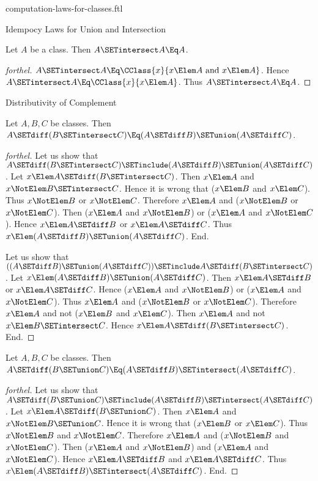 \documentclass{stex}
\begin{document}
\begin{smodule}{computation-laws-for-classes.ftl}
\begin{sfragment}{Idempocy Laws for Union and Intersection}
  \begin{proposition}[forthel]
    Let $A$ be a class.
    Then $A \SETintersect A \Eq A$.
  \end{proposition}
  \begin{proof}[forthel]
    $A \SETintersect A \Eq \CClass{x}{x \Elem A\text{ and }x \Elem A}$.
    Hence $A \SETintersect A \Eq \CClass{x}{x \Elem A}$.
    Thus $A \SETintersect A \Eq A$.
  \end{proof}
\end{sfragment}

\begin{sfragment}{Distributivity of Complement}
  \begin{proposition}[forthel]
    Let $A, B, C$ be classes.
    Then $A \SETdiff (B \SETintersect C) \Eq (A \SETdiff B) \SETunion (A \SETdiff C)$.
  \end{proposition}
  \begin{proof}[forthel]
    Let us show that $A \SETdiff (B \SETintersect C) \SETinclude (A \SETdiff B) \SETunion (A \SETdiff C)$.
      Let $x \Elem A \SETdiff (B \SETintersect C)$.
      Then $x \Elem A$ and $x \NotElem B \SETintersect C$.
      Hence it is wrong that ($x \Elem B$ and $x \Elem C$).
      Thus $x \NotElem B$ or $x \NotElem C$.
      Therefore $x \Elem A$ and ($x \NotElem B$ or $x \NotElem C$).
      Then ($x \Elem A$ and $x \NotElem B$) or ($x \Elem A$ and $x \NotElem C$).
      Hence $x \Elem A \SETdiff B$ or $x \Elem A \SETdiff C$.
      Thus $x \Elem (A \SETdiff B) \SETunion (A \SETdiff C)$.
    End.

    Let us show that $((A \SETdiff B) \SETunion (A \SETdiff C)) \SETinclude A \SETdiff (B \SETintersect C)$. %
      Let $x \Elem (A \SETdiff B) \SETunion (A \SETdiff C)$.
      Then $x \Elem A \SETdiff B$ or $x \Elem A \SETdiff C$.
      Hence ($x \Elem A$ and $x \NotElem B$) or ($x \Elem A$ and $x \NotElem C$).
      Thus $x \Elem A$ and ($x \NotElem B$ or $x \NotElem C$).
      Therefore $x \Elem A$ and not ($x \Elem B$ and $x \Elem C$).
      Then $x \Elem A$ and not $x \Elem B \SETintersect C$.
      Hence $x \Elem A \SETdiff (B \SETintersect C)$.
    End.
  \end{proof}

  \begin{proposition}[forthel]
    Let $A, B, C$ be classes.
    Then $A \SETdiff (B \SETunion C) \Eq (A \SETdiff B) \SETintersect (A \SETdiff C)$.
  \end{proposition}
  \begin{proof}[forthel]
    Let us show that $A \SETdiff (B \SETunion C) \SETinclude (A \SETdiff B) \SETintersect (A \SETdiff C)$.
      Let $x \Elem A \SETdiff (B \SETunion C)$.
      Then $x \Elem A$ and $x \NotElem B \SETunion C$.
      Hence it is wrong that ($x \Elem B$ or $x \Elem C$).
      Thus $x \NotElem B$ and $x \NotElem C$.
      Therefore $x \Elem A$ and ($x \NotElem B$ and $x \NotElem C$).
      Then ($x \Elem A$ and $x \NotElem B$) and ($x \Elem A$ and $x \NotElem C$).
      Hence $x \Elem A \SETdiff B$ and $x \Elem A \SETdiff C$.
      Thus $x \Elem (A \SETdiff B) \SETintersect (A \SETdiff C)$.
    End.


\end{proof}
\end{sfragment}
\end{smodule}
\end{document}
